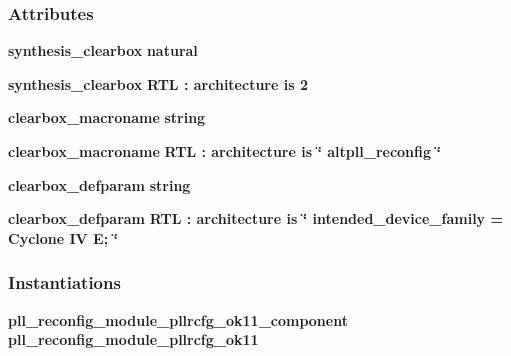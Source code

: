 \subsubsection*{Attributes}
 \begin{DoxyCompactItemize}
\item 
{\bf synthesis\+\_\+clearbox} {\bfseries \textcolor{comment}{natural}\textcolor{vhdlchar}{ }} 
\item 
{\bf synthesis\+\_\+clearbox} {\bfseries \textcolor{vhdlchar}{R\+TL}\textcolor{vhdlchar}{ }\textcolor{vhdlchar}{\+:}\textcolor{vhdlchar}{ }\textcolor{keywordflow}{architecture}\textcolor{vhdlchar}{ }\textcolor{keywordflow}{is}\textcolor{vhdlchar}{ }\textcolor{vhdlchar}{ } \textcolor{vhdldigit}{2} \textcolor{vhdlchar}{ }} 
\item 
{\bf clearbox\+\_\+macroname} {\bfseries \textcolor{comment}{string}\textcolor{vhdlchar}{ }} 
\item 
{\bf clearbox\+\_\+macroname} {\bfseries \textcolor{vhdlchar}{R\+TL}\textcolor{vhdlchar}{ }\textcolor{vhdlchar}{\+:}\textcolor{vhdlchar}{ }\textcolor{keywordflow}{architecture}\textcolor{vhdlchar}{ }\textcolor{keywordflow}{is}\textcolor{vhdlchar}{ }\textcolor{vhdlchar}{ }\textcolor{vhdlchar}{ }\textcolor{vhdlchar}{ }\textcolor{keyword}{\char`\"{} altpll\+\_\+reconfig \char`\"{}}\textcolor{vhdlchar}{ }} 
\item 
{\bf clearbox\+\_\+defparam} {\bfseries \textcolor{comment}{string}\textcolor{vhdlchar}{ }} 
\item 
{\bf clearbox\+\_\+defparam} {\bfseries \textcolor{vhdlchar}{R\+TL}\textcolor{vhdlchar}{ }\textcolor{vhdlchar}{\+:}\textcolor{vhdlchar}{ }\textcolor{keywordflow}{architecture}\textcolor{vhdlchar}{ }\textcolor{keywordflow}{is}\textcolor{vhdlchar}{ }\textcolor{vhdlchar}{ }\textcolor{vhdlchar}{ }\textcolor{vhdlchar}{ }\textcolor{keyword}{\char`\"{} intended\+\_\+device\+\_\+family = Cyclone I\+V E; \char`\"{}}\textcolor{vhdlchar}{ }} 
\end{DoxyCompactItemize}
\subsubsection*{Instantiations}
 \begin{DoxyCompactItemize}
\item 
{\bf pll\+\_\+reconfig\+\_\+module\+\_\+pllrcfg\+\_\+ok11\+\_\+component}  {\bfseries pll\+\_\+reconfig\+\_\+module\+\_\+pllrcfg\+\_\+ok11}   
\end{DoxyCompactItemize}


